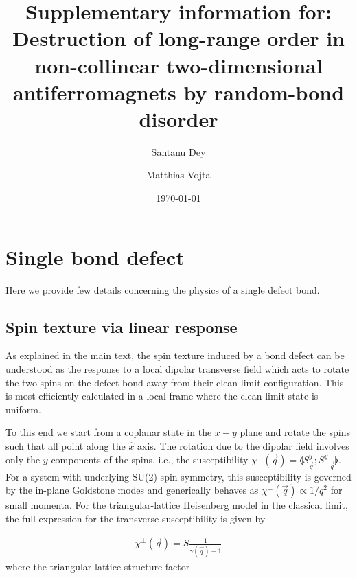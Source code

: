 \documentclass[twocolumn,english,aps,prl,floatfix]{revtex4-1}
\begin{document}
\title{Supplementary information for:\\
Destruction of long-range order in non-collinear two-dimensional antiferromagnets by random-bond disorder
}

\author{Santanu Dey}
\author{Matthias Vojta}

\date{\today}

\maketitle

\section{Single bond defect}

Here we provide few details concerning the physics of a single 
defect bond.

\subsection{Spin texture via linear response}

As explained in the main text, the spin texture induced by a bond 
defect can be understood as the response to a local dipolar 
transverse field which acts to rotate the two spins on the defect 
bond away from their clean-limit configuration. This is most 
efficiently calculated in a local frame where the clean-limit state 
is uniform. 

To this end we start from a coplanar state in the $x-y$ plane and 
rotate the spins such that all point along the $\hat{x}$ axis. The 
rotation due to the dipolar field involves only the $y$ components 
of the  spins, i.e., the susceptibility 
$\chi^\perp(\vec{q}) = \llangle S_{\vec{q}}^y; S^y_{-\vec{q}} \rrangle$. 
For a system with underlying SU(2) spin symmetry, this susceptibility
is governed by the in-plane Goldstone modes and generically behaves 
as $\chi^\perp(\vec{q})\propto 1/q^2$ for small momenta. For the 
triangular-lattice Heisenberg model in the classical limit, the 
full expression for the transverse susceptibility is given by
\cite{wollny-thesis16}

\begin{align}
    \chi^\perp(\vec{q}) = S\frac{1}{\gamma(\vec{q})-1}
\end{align}
where the triangular lattice structure factor 
\end{document}
